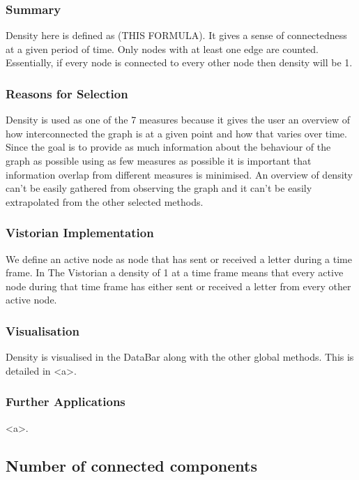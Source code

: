 \subsubsection{Summary}
Density here is defined as (THIS FORMULA). It gives a sense of connectedness at a given period of time. Only nodes with at least one edge are counted. Essentially, if every node is connected to every other node then density will be 1. 

\subsubsection{Reasons for Selection}
Density is used as one of the 7 measures because it gives the user an overview of how interconnected the graph is at a given point and how that varies over time. Since the goal is to provide as much information about the behaviour of the graph as possible using as few measures as possible it is important that information overlap from different measures is minimised. An overview of density can't be easily gathered from observing the graph and it can't be easily extrapolated from the other selected methods.

\subsubsection{Vistorian Implementation}
We define an active node as node that has sent or received a letter during a time frame. In The Vistorian a density of 1 at a time frame means that every  active node during that time frame has either sent or received a letter from every other active node.

\subsubsection{Visualisation}
Density is visualised in the DataBar along with the other global methods. This is detailed in <a>.

\subsubsection{Further Applications}
<a>.

\subsection{Number of connected components}

